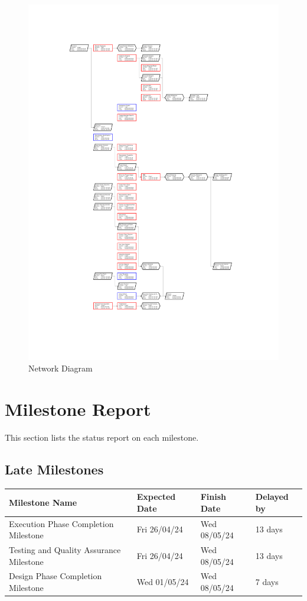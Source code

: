 \begin{figure}[ht]
    \includegraphics[width=\textwidth]{images/network.png}
    \caption{Network Diagram}
    \label{fig:rn_chart1}
\end{figure}

\FloatBarrier

\section{Milestone Report}

This section lists the status report on each milestone.

\subsection*{Late Milestones}
\begin{tabular}{|l|l|l|l|}
\hline
\rowcolor{lightred} Milestone Name & Expected Date & Finish Date & Delayed by \\
\hline
Execution Phase Completion Milestone & Fri 26/04/24 & Wed 08/05/24 & 13 days \\
\hline
Testing and Quality Assurance Milestone & Fri 26/04/24 & Wed 08/05/24 & 13 days \\
\hline
Design Phase Completion Milestone & Wed 01/05/24 & Wed 08/05/24 & 7 days \\
\hline
\end{tabular}

